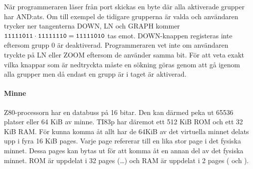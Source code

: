 \documentclass[main.tex]{subfiles}
\begin{document}
När programmeraren läser från port  skickas en byte där alla
aktiverade grupper har AND:ats. Om till exempel de tidigare grupperna är valda
och användaren trycker ner tangenterna DOWN, LN och GRAPH kommer
$\texttt{11111011} \cdot \texttt{11111110} = \texttt{11111010}$ tas emot.
DOWN-knappen registeras inte eftersom grupp 0 är deaktiverad. Programmeraren
vet inte om användaren tryckte på LN eller ZOOM eftersom de använder samma bit.
För att veta exakt vilka knappar som är nedtryckta måste en sökning göras genom
att gå igenom alla grupper men då endast en grupp är i taget är aktiverad.

\paragraph{Minne}
Z80-processorn har en databuss på 16 bitar. Den kan därmed peka ut 65536
platser eller 64 KiB av minne. TI83p har däremot ett 512 KiB ROM och ett 32 KiB
RAM. För kunna komma åt allt har de 64KiB av det virtuella minnet delats upp i
fyra 16 KiB pages. Varje page refererar till en lika stor page i det fysiska
minnet. Dessa pages kan bytas ut för att komma åt en annan del av det fysiska
minnet.  ROM är uppdelat i 32 pages (\dots{}) och RAM
är uppdelat i 2 pages ( och ).
\end{document}
